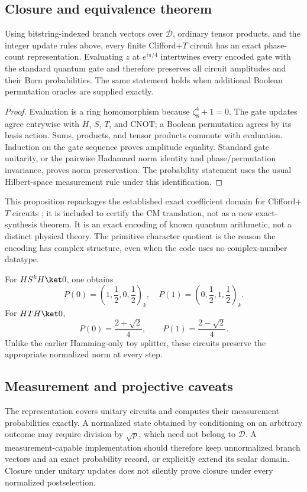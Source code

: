 \subsection{Closure and equivalence theorem}
\begin{proposition}\label{thm:exact}
Using bitstring-indexed branch vectors over $\mathcal D$, ordinary tensor products, and the integer update rules above, every finite Clifford+$T$ circuit has an exact phase-count representation. Evaluating $z$ at $e^{i\pi/4}$ intertwines every encoded gate with the standard quantum gate and therefore preserves all circuit amplitudes and their Born probabilities. The same statement holds when additional Boolean permutation oracles are supplied exactly.
\end{proposition}
\begin{proof}
Evaluation is a ring homomorphism because $\zeta_8^4+1=0$. The gate updates agree entrywise with $H$, $S$, $T$, and CNOT; a Boolean permutation agrees by its basis action. Sums, products, and tensor products commute with evaluation. Induction on the gate sequence proves amplitude equality. Standard gate unitarity, or the pairwise Hadamard norm identity and phase/permutation invariance, proves norm preservation. The probability statement uses the usual Hilbert-space measurement rule under this identification.
\end{proof}
This proposition repackages the established exact coefficient domain for Clifford+$T$ circuits \cite{giles,kmm}; it is included to certify the CM translation, not as a new exact-synthesis theorem. It is an exact encoding of known quantum arithmetic, not a distinct physical theory. The primitive character quotient is the reason the encoding has complex structure, even when the code uses no complex-number datatype.

For $H S^k H\ket0$, one obtains
\begin{equation}
 P(0)=\left(1,\frac12,0,\frac12\right)_k,\quad
 P(1)=\left(0,\frac12,1,\frac12\right)_k.
\end{equation}
For $HTH\ket0$,
\begin{equation}
 P(0)=\frac{2+\sqrt2}{4},\qquad P(1)=\frac{2-\sqrt2}{4}.
\end{equation}
Unlike the earlier Hamming-only toy splitter, these circuits preserve the appropriate normalized norm at every step.

\subsection{Measurement and projective caveats}
The representation covers unitary circuits and computes their measurement probabilities exactly. A normalized state obtained by conditioning on an arbitrary outcome may require division by $\sqrt p$, which need not belong to $\mathcal D$. A measurement-capable implementation should therefore keep unnormalized branch vectors and an exact probability record, or explicitly extend its scalar domain. Closure under unitary updates does not silently prove closure under every normalized postselection.

